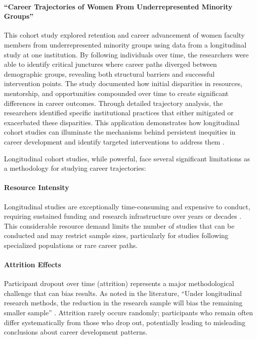 \documentclass[../main.tex]{subfiles}
\begin{document}
\paragraph{``Career Trajectories of Women From Underrepresented Minority Groups''}
This cohort study explored retention and career advancement of women faculty members from underrepresented minority groups using data from a longitudinal study at one institution. By following individuals over time, the researchers were able to identify critical junctures where career paths diverged between demographic groups, revealing both structural barriers and successful intervention points. The study documented how initial disparities in resources, mentorship, and opportunities compounded over time to create significant differences in career outcomes. Through detailed trajectory analysis, the researchers identified specific institutional practices that either mitigated or exacerbated these disparities. This application demonstrates how longitudinal cohort studies can illuminate the mechanisms behind persistent inequities in career development and identify targeted interventions to address them \cite{rios2021career}.


Longitudinal cohort studies, while powerful, face several significant limitations as a methodology for studying career trajectories:

\paragraph{Resource Intensity}
Longitudinal studies are exceptionally time-consuming and expensive to conduct, requiring sustained funding and research infrastructure over years or decades \cite{wikipedia2024longitudinal}. This considerable resource demand limits the number of studies that can be conducted and may restrict sample sizes, particularly for studies following specialized populations or rare career paths.

\paragraph{Attrition Effects}
Participant dropout over time (attrition) represents a major methodological challenge that can bias results. As noted in the literature, ``Under longitudinal research methods, the reduction in the research sample will bias the remaining smaller sample'' \cite{wikipedia2024longitudinal}. Attrition rarely occurs randomly; participants who remain often differ systematically from those who drop out, potentially leading to misleading conclusions about career development patterns.
\end{document}

